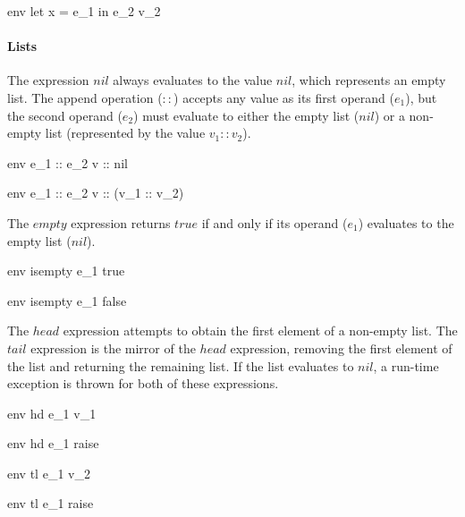 \documentclass{article}
\begin{document}
	{\mbox{env} \vdash let \; x = e_1 \; in \; e_2 \Downarrow v_2}
	
\bigskip

\paragraph{Lists}
The expression $nil$ always evaluates to the value $nil$, which represents an empty list.
The append operation ($::$) accepts any value as its first operand ($e_1$), but the second operand ($e_2$) must evaluate to either the empty list ($nil$) or a non-empty list (represented by the value $v_1 :: v_2$).


	{\mbox{env} \vdash e_1 :: e_2 \Downarrow v :: nil}
	
	{\mbox{env} \vdash e_1 :: e_2 \Downarrow v :: (v_1 :: v_2)}
	
The $empty$ expression returns $true$ if and only if its operand ($e_1$) evaluates to the empty list ($nil$).

	{\mbox{env} \vdash isempty \; e_1 \Downarrow true}
	
	{\mbox{env} \vdash isempty \; e_1 \Downarrow false}

The $head$ expression attempts to obtain the first element of a non-empty list.
The $tail$ expression is the mirror of the $head$ expression, removing the first element of the list and returning the remaining list.
If the list evaluates to $nil$, a run-time exception is thrown for both of these expressions.

	{\mbox{env} \vdash hd \; e_1 \Downarrow v_1}

	{\mbox{env} \vdash hd \; e_1 \Downarrow raise}
		
	{\mbox{env} \vdash tl \; e_1 \Downarrow v_2}

	{\mbox{env} \vdash tl \; e_1 \Downarrow raise}
	
\end{document}
